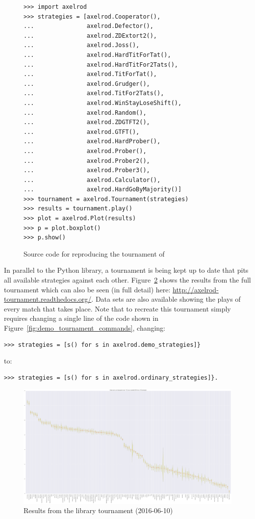 \documentclass{jors}
\begin{document}
\begin{figure}[!hbtp]
    \begin{verbatim}
>>> import axelrod
>>> strategies = [axelrod.Cooperator(),
...               axelrod.Defector(),
...               axelrod.ZDExtort2(),
...               axelrod.Joss(),
...               axelrod.HardTitForTat(),
...               axelrod.HardTitFor2Tats(),
...               axelrod.TitForTat(),
...               axelrod.Grudger(),
...               axelrod.TitFor2Tats(),
...               axelrod.WinStayLoseShift(),
...               axelrod.Random(),
...               axelrod.ZDGTFT2(),
...               axelrod.GTFT(),
...               axelrod.HardProber(),
...               axelrod.Prober(),
...               axelrod.Prober2(),
...               axelrod.Prober3(),
...               axelrod.Calculator(),
...               axelrod.HardGoByMajority()]
>>> tournament = axelrod.Tournament(strategies)
>>> results = tournament.play()
>>> plot = axelrod.Plot(results)
>>> p = plot.boxplot()
>>> p.show()
    \end{verbatim}
    \caption{Source code for reproducing the tournament of \cite{Stewart2012}}
    \label{fig:stewart-code}
\end{figure}

In parallel to the Python library, a tournament is being kept up to date that
pits all available strategies against each other. Figure~\ref{fig:tournament}
shows the results from the full tournament which can also be seen (in full
detail) here: \url{http://axelrod-tournament.readthedocs.org/}. Data sets are
also available showing the plays of every match that takes place. Note that to
recreate this tournament simply requires changing a single line of the code
shown in Figure~\ref{fig:demo_tournament_commands}, changing:

\begin{verbatim}
>>> strategies = [s() for s in axelrod.demo_strategies]}
\end{verbatim}

to:

\begin{verbatim}
>>> strategies = [s() for s in axelrod.ordinary_strategies]}.
\end{verbatim}

\begin{figure}[!hbtp]
    \centering
    \includegraphics[width=.75\textwidth]{tournament.pdf}
    \caption{Results from the library tournament (2016-06-10)}
    \label{fig:tournament}
\end{figure}
\end{document}
